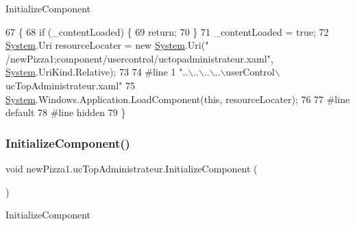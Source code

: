 Initialize\+Component 


\begin{DoxyCode}
67                                           \{
68             \textcolor{keywordflow}{if} (\_contentLoaded) \{
69                 \textcolor{keywordflow}{return};
70             \}
71             \_contentLoaded = \textcolor{keyword}{true};
72             \hyperlink{namespaceSystem}{System}.Uri resourceLocater = \textcolor{keyword}{new} \hyperlink{namespaceSystem}{System}.Uri(\textcolor{stringliteral}{"
      /newPizza1;component/usercontrol/uctopadministrateur.xaml"}, \hyperlink{namespaceSystem}{System}.UriKind.Relative);
73             
74 \textcolor{preprocessor}{            #line 1 "..\(\backslash\)..\(\backslash\)..\(\backslash\)..\(\backslash\)userControl\(\backslash\)ucTopAdministrateur.xaml"
}
75             \hyperlink{namespaceSystem}{System}.Windows.Application.LoadComponent(\textcolor{keyword}{this}, resourceLocater);
76             
77 \textcolor{preprocessor}{            #line default
}
78 \textcolor{preprocessor}{            #line hidden
}
79         \}
\end{DoxyCode}
\mbox{\label{classnewPizza1_1_1ucTopAdministrateur_a79b4fb5df50a0755f8616ccd6d462953}} 
\subsubsection{\texorpdfstring{Initialize\+Component()}{InitializeComponent()}\hspace{0.1cm}{\footnotesize\ttfamily [3/4]}}
{\footnotesize\ttfamily void new\+Pizza1.\+uc\+Top\+Administrateur.\+Initialize\+Component (\begin{DoxyParamCaption}{ }\end{DoxyParamCaption})\hspace{0.3cm}{\ttfamily [inline]}}



Initialize\+Component 


